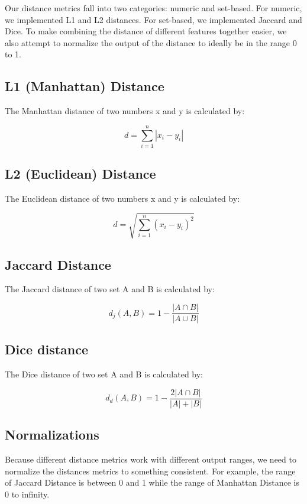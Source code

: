 \documentclass{article}
\begin{document}
Our distance metrics fall into two categories: numeric and set-based.
For numeric, we implemented L1 and L2 distances.
For set-based, we implemented Jaccard and Dice.
To make combining the distance of different features together easier, we also attempt to normalize the output of the distance to ideally be in the range 0 to 1.

\subsection{L1 (Manhattan) Distance}
The Manhattan distance of two numbers x and y is calculated by:

$$ d = \sum_{i=1}^{n}|x_{i}-y_{i}| $$

\subsection{L2 (Euclidean) Distance}
The Euclidean distance of two numbers x and y is calculated by:

$$ d = \sqrt{\sum_{i=1}^{n}(x_{i} - y_{i})^2} $$

\subsection{Jaccard Distance}
The Jaccard distance of two set A and B is calculated by:

$$ d_{j}(A,B) = 1 - \frac{|A\cap B|}{|A\cup B|}$$

\subsection{Dice distance}
The Dice distance of two set A and B is calculated by:

$$d_{d}(A, B) = 1 - \frac{2|A \cap B|}{|A| + |B|} $$

\subsection{Normalizations}
Because different distance metrics work with different output ranges, we need to normalize the distances metrics to something consistent.
For example, the range of Jaccard Distance is between 0 and 1 while the range of Manhattan Distance is 0 to infinity.
\end{document}
